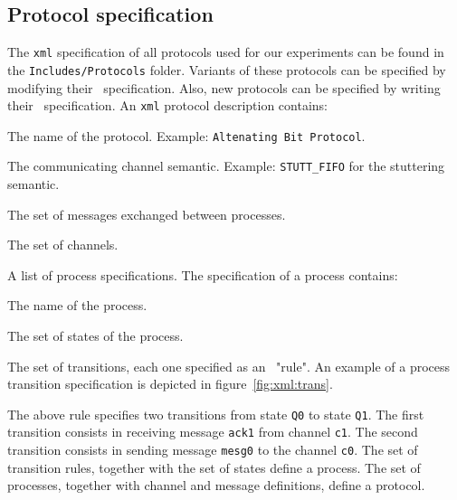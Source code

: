 \subsection*{Protocol specification}

The \texttt{xml} specification of all protocols used for our experiments can be found in the \texttt{Includes/Protocols} folder.
%
Variants of these protocols can be specified by modifying their \xml\ specification.
Also, new protocols can be specified by writing their \xml\ specification.
%
An \texttt{xml} protocol description contains:
\begin{inparaenum}
\item The name of the protocol. Example: \texttt{Altenating Bit Protocol}.
\item The communicating channel semantic. Example: \texttt{STUTT\_FIFO} for the stuttering semantic.
\item The set of messages exchanged between processes.
\item The set of channels.
\item A list of process specifications. The specification of a process contains:
\begin{inparaenum}
\item The name of the process.
\item The set of states of the process.
\item The set of transitions, each one specified as an \Xml\ "rule". An example of a process transition specification is depicted in figure~\ref{fig:xml:trans}.
\end{inparaenum}
\end{inparaenum}

The above rule specifies two transitions from  state {\tt Q0} to  state {\tt Q1}.
The first transition consists in receiving message {\tt ack1} from channel {\tt c1}.
The second transition consists in sending message {\tt mesg0} to the channel {\tt c0}.
The set of transition rules, together with the set of states define a process.
The set of processes, together with channel and message definitions, define a protocol.


